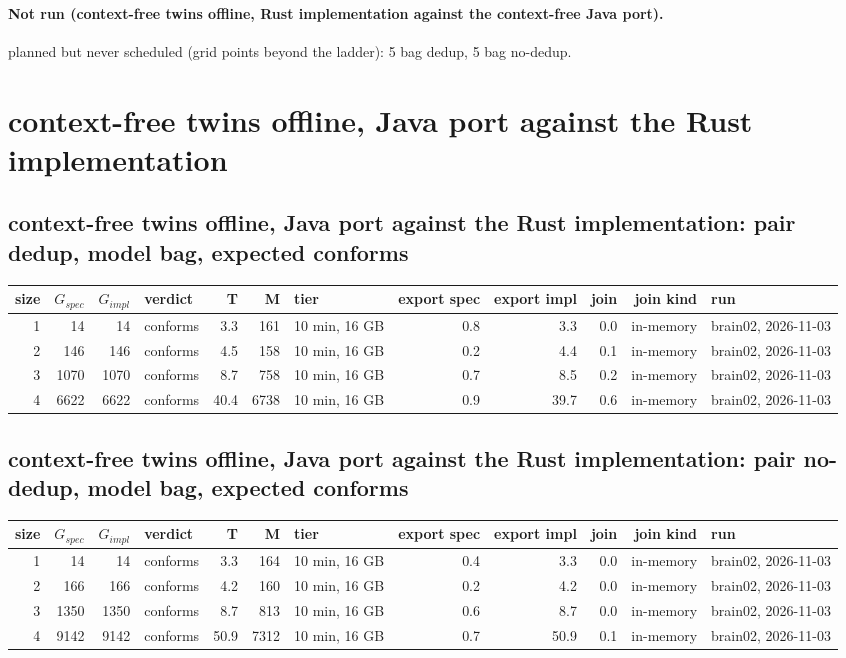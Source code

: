 \documentclass[10pt]{article}
\begin{document}
\paragraph{Not run (context-free twins offline, Rust implementation against the context-free Java port).}
planned but never scheduled (grid points beyond the ladder): 5 bag dedup, 5 bag no-dedup.\par
\section*{context-free twins offline, Java port against the Rust implementation}
\subsection*{context-free twins offline, Java port against the Rust implementation: pair \textsf{dedup}, model bag, expected conforms}
\begin{longtable}{@{}rrrlrrlrrrrl@{}}
\toprule
size & $G_{\mathit{spec}}$ & $G_{\mathit{impl}}$ & verdict & T & M & tier & export spec & export impl & join & join kind & run \\
\midrule
\endhead
\color{red} 1 & 14 & 14 & conforms & 3.3 & 161 & 10 min, 16 GB & 0.8 & 3.3 & 0.0 & in-memory & brain02, 2026-11-03 \\
\color{red} 2 & 146 & 146 & conforms & 4.5 & 158 & 10 min, 16 GB & 0.2 & 4.4 & 0.1 & in-memory & brain02, 2026-11-03 \\
\color{red} 3 & 1070 & 1070 & conforms & 8.7 & 758 & 10 min, 16 GB & 0.7 & 8.5 & 0.2 & in-memory & brain02, 2026-11-03 \\
\color{red} 4 & 6622 & 6622 & conforms & 40.4 & 6738 & 10 min, 16 GB & 0.9 & 39.7 & 0.6 & in-memory & brain02, 2026-11-03 \\
\bottomrule
\end{longtable}
\subsection*{context-free twins offline, Java port against the Rust implementation: pair \textsf{no-dedup}, model bag, expected conforms}
\begin{longtable}{@{}rrrlrrlrrrrl@{}}
\toprule
size & $G_{\mathit{spec}}$ & $G_{\mathit{impl}}$ & verdict & T & M & tier & export spec & export impl & join & join kind & run \\
\midrule
\endhead
\color{red} 1 & 14 & 14 & conforms & 3.3 & 164 & 10 min, 16 GB & 0.4 & 3.3 & 0.0 & in-memory & brain02, 2026-11-03 \\
\color{red} 2 & 166 & 166 & conforms & 4.2 & 160 & 10 min, 16 GB & 0.2 & 4.2 & 0.0 & in-memory & brain02, 2026-11-03 \\
\color{red} 3 & 1350 & 1350 & conforms & 8.7 & 813 & 10 min, 16 GB & 0.6 & 8.7 & 0.0 & in-memory & brain02, 2026-11-03 \\
\color{red} 4 & 9142 & 9142 & conforms & 50.9 & 7312 & 10 min, 16 GB & 0.7 & 50.9 & 0.1 & in-memory & brain02, 2026-11-03 \\
\bottomrule
\end{longtable}
\end{document}
